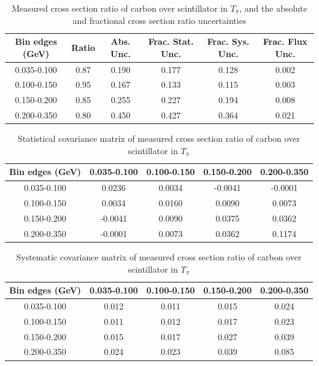 \documentclass[../main.tex]{subfiles}
\begin{document}
\begin{table}
  \centering
  \renewcommand{\arraystretch}{1.15}
  \caption{Measured cross section ratio of carbon over scintillator in $T_{\pi}$, and the absolute and fractional cross section ratio uncertainties}
    \begin{tabular}{c||c|c||c|c|c}
      Bin edges (GeV) &  Ratio  &  Abs. Unc.  &  Frac. Stat. Unc.  &  Frac. Sys. Unc.  &  Frac. Flux Unc. \\
      \hline
      \hline
      0.035-0.100 & 0.87 & 0.190 & 0.177 & 0.128 & 0.002\\
      0.100-0.150 & 0.95 & 0.167 & 0.133 & 0.115 & 0.003\\
      0.150-0.200 & 0.85 & 0.255 & 0.227 & 0.194 & 0.008\\
      0.200-0.350 & 0.80 & 0.450 & 0.427 & 0.364 & 0.021
    \end{tabular}
  \label{tbl:rationucleonnuc6pion_ekina}
\end{table}
\begin{table}
  \centering
  \renewcommand{\arraystretch}{1.15}
  \caption{Statistical covariance matrix of measured cross section ratio of carbon over scintillator in $T_{\pi}$}
    \begin{tabular}{c||cccc}
      Bin edges (GeV) & 0.035-0.100 & 0.100-0.150 & 0.150-0.200 & 0.200-0.350\\
      \hline
      \hline
      0.035-0.100 & 0.0236 & 0.0034 & -0.0041 & -0.0001\\
      0.100-0.150 & 0.0034 & 0.0160 & 0.0090 & 0.0073\\
      0.150-0.200 & -0.0041 & 0.0090 & 0.0375 & 0.0362\\
      0.200-0.350 & -0.0001 & 0.0073 & 0.0362 & 0.1174
    \end{tabular}
  \label{tbl:rationucleonnuc6pion_ekinb}
\end{table}
\begin{table}
  \centering
  \renewcommand{\arraystretch}{1.15}
  \caption{Systematic covariance matrix of measured cross section ratio of carbon over scintillator in $T_{\pi}$}
    \begin{tabular}{c||cccc}
      Bin edges (GeV) & 0.035-0.100 & 0.100-0.150 & 0.150-0.200 & 0.200-0.350\\
      \hline
      \hline
      0.035-0.100 & 0.012 & 0.011 & 0.015 & 0.024\\
      0.100-0.150 & 0.011 & 0.012 & 0.017 & 0.023\\
      0.150-0.200 & 0.015 & 0.017 & 0.027 & 0.039\\
      0.200-0.350 & 0.024 & 0.023 & 0.039 & 0.085
    \end{tabular}
  \label{tbl:rationucleonnuc6pion_ekinc}
\end{table}
\end{document}
